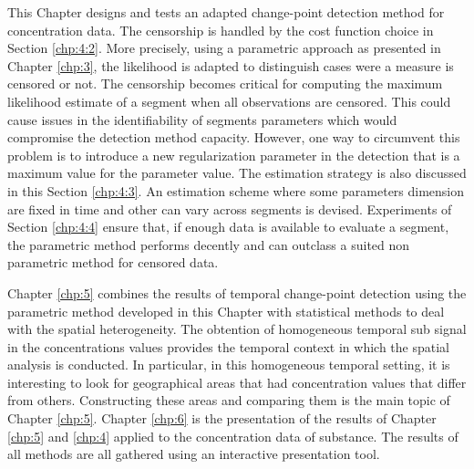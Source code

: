 This Chapter designs and tests an adapted change-point detection method for concentration data. The censorship is handled by the cost function choice in Section \ref{chp:4:2}. More precisely, using a parametric approach as presented in Chapter \ref{chp:3}, the likelihood is adapted to distinguish cases were a measure is censored or not. The censorship becomes critical for computing the maximum likelihood estimate of a segment when all observations are censored. This could cause issues in the identifiability of segments parameters which would compromise the detection method capacity. However, one way to circumvent this problem is to introduce a new regularization parameter in the detection that is a maximum value for the parameter value. The estimation strategy is also discussed in this Section \ref{chp:4:3}. An estimation scheme where some parameters dimension are fixed in time and other can vary across segments is devised. Experiments of Section \ref{chp:4:4} ensure that, if enough data is available to evaluate a segment, the parametric method performs decently and can outclass a suited non parametric method for censored data. 

Chapter \ref{chp:5} combines the results of temporal change-point detection using the parametric method developed in this Chapter with statistical methods to deal with the spatial heterogeneity. The obtention of homogeneous temporal sub signal in the concentrations values provides the temporal context in which the spatial analysis is conducted. In particular, in this homogeneous temporal setting, it is interesting to look for geographical areas that had concentration values that differ from others. Constructing these areas and comparing them is the main topic of Chapter \ref{chp:5}. Chapter \ref{chp:6} is the presentation of the results of Chapter \ref{chp:5} and \ref{chp:4} applied to the concentration data of substance. The results of all methods are all gathered using an interactive presentation tool.     

       

 